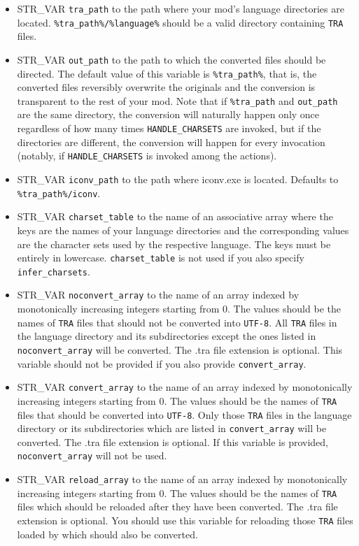 \documentclass{article}
\def\ttref#1{\ahrefloc{#1}{\tt #1}}
\def\t#1{{\tt #1}}
\begin{document}
\begin{itemize}
\item STR_VAR \verb+tra_path+ to the path where your mod's language directories are located. \verb+%tra_path%/%language%+ should be a valid directory containing \t{TRA} files.
\item STR_VAR \verb+out_path+ to the path to which the converted files should be directed. The default value of this variable is \verb+%tra_path%+, that is, the converted files reversibly overwrite the originals and the conversion is transparent to the rest of your mod. Note that if \verb+%tra_path+ and \verb+out_path+ are the same directory, the conversion will naturally happen only once regardless of how many times \verb+HANDLE_CHARSETS+ are invoked, but if the directories are different, the conversion will happen for every invocation (notably, if \verb+HANDLE_CHARSETS+ is invoked among the \ttref{ALWAYS} actions).
\item STR_VAR \verb+iconv_path+ to the path where iconv.exe is located. Defaults to \verb+%tra_path%/iconv+.
\item STR_VAR \verb+charset_table+ to the name of an associative array where the keys are the names of your language directories and the corresponding values are the character sets used by the respective language. The keys must be entirely in lowercase. \verb+charset_table+ is not used if you also specify \verb+infer_charsets+.
\item STR_VAR \verb+noconvert_array+ to the name of an array indexed by monotonically increasing integers starting from 0. The values should be the names of \t{TRA} files that should not be converted into \t{UTF-8}. All \t{TRA} files in the language directory and its subdirectories except the ones listed in \verb+noconvert_array+ will be converted. The .tra file extension is optional. This variable should not be provided if you also provide \verb+convert_array+.
\item STR_VAR \verb+convert_array+ to the name of an array indexed by monotonically increasing integers starting from 0. The values should be the names of \t{TRA} files that should be converted into \t{UTF-8}. Only those \t{TRA} files in the language directory or its subdirectories which are listed in \verb+convert_array+ will be converted. The .tra file extension is optional. If this variable is provided, \verb+noconvert_array+ will not be used.
\item STR_VAR \verb+reload_array+ to the name of an array indexed by monotonically increasing integers starting from 0. The values should be the names of \t{TRA} files which should be reloaded after they have been converted. The .tra file extension is optional. You should use this variable for reloading those \t{TRA} files loaded by \ttref{LANGUAGE} which should also be converted.

\end{itemize}
\end{document}

